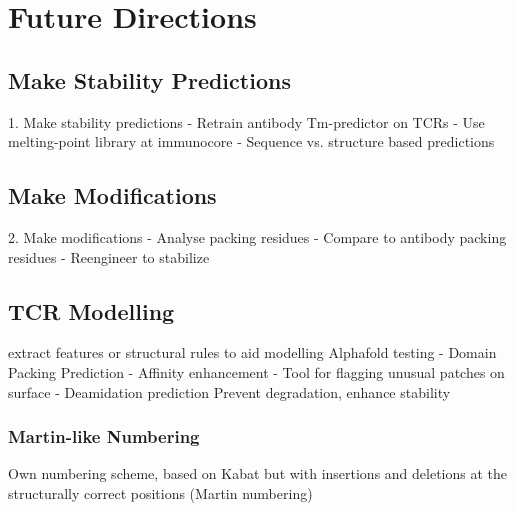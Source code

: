 \chapter{Future Directions}
\label{chapterlabel3}

\section{Make Stability Predictions}
1. Make stability predictions
-  Retrain antibody Tm-predictor on TCRs
-  Use melting-point library at immunocore
-  Sequence vs. structure based predictions
\section{Make Modifications}
2. Make modifications
-  Analyse packing residues
-  Compare to antibody packing residues
-  Reengineer to stabilize

\section{TCR Modelling}
extract features or structural rules to aid modelling
Alphafold testing
-  Domain Packing Prediction
-  Affinity enhancement
-  Tool for flagging unusual patches on surface
-  Deamidation prediction
Prevent degradation, enhance stability

\subsection{Martin-like Numbering}
Own numbering scheme, based on Kabat but with insertions and deletions at the structurally correct positions (Martin numbering)

